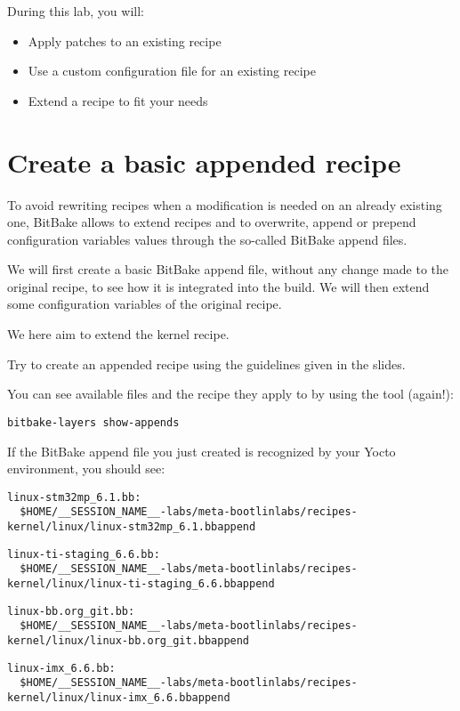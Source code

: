 
During this lab, you will:
\begin{itemize}
  \item Apply patches to an existing recipe
  \item Use a custom configuration file for an existing recipe
  \item Extend a recipe to fit your needs
\end{itemize}

\section{Create a basic appended recipe}

To avoid rewriting recipes when a modification is needed on an already existing
one, BitBake allows to extend recipes and to overwrite, append or prepend
configuration variables values through the so-called BitBake append files.

We will first create a basic BitBake append file, without any change made
to the original recipe, to see how it is integrated into the build. We will then
extend some configuration variables of the original recipe.

We here aim to extend the  kernel recipe.

Try to create an appended recipe using the guidelines given in the slides.

You can see available  files and the recipe they apply to by
using the  tool (again!):
\begin{verbatim}
bitbake-layers show-appends
\end{verbatim}

If the BitBake append file you just created is recognized by your Yocto
environment, you should see:
\if{}
\begin{verbatim}
linux-stm32mp_6.1.bb:
  $HOME/__SESSION_NAME__-labs/meta-bootlinlabs/recipes-kernel/linux/linux-stm32mp_6.1.bbappend
\end{verbatim}
\fi
\if{}
\begin{verbatim}
linux-ti-staging_6.6.bb:
  $HOME/__SESSION_NAME__-labs/meta-bootlinlabs/recipes-kernel/linux/linux-ti-staging_6.6.bbappend
\end{verbatim}
\fi
\if{}
\begin{verbatim}
linux-bb.org_git.bb:
  $HOME/__SESSION_NAME__-labs/meta-bootlinlabs/recipes-kernel/linux/linux-bb.org_git.bbappend
\end{verbatim}
\fi
\if{}
\begin{verbatim}
linux-imx_6.6.bb:
  $HOME/__SESSION_NAME__-labs/meta-bootlinlabs/recipes-kernel/linux/linux-imx_6.6.bbappend
\end{verbatim}
\fi

